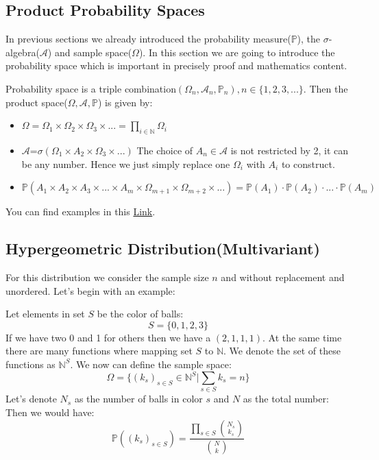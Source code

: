 \documentclass{article}
\newcommand{\N}{\mathbb{N}}
\newcommand{\Prob}{\mathbb{P}}
\begin{document}
\subsection{Product Probability Spaces}
In previous sections we already introduced the probability measure($\Prob$), the $\sigma$-algebra($\mathcal{A}$) and sample space($\Omega$). In this section we are going to introduce the probability space which is important in precisely proof and mathematics content.
\begin{definition}
	 Probability space is a triple combination$(\Omega_n,\mathcal{A}_n,\Prob_n), n\in \{1,2,3,...\}$. Then the product space($\Omega,\mathcal{A},\Prob$) is given by:\begin{itemize}
	 	\item $\Omega=\Omega_1\times\Omega_2\times\Omega_3\times...=\prod_{i\in \N}\Omega_i$
	 	\item $\mathcal{A}$=$\sigma(\Omega_1\times{A}_2\times\Omega_3\times...)$ The choice of $A_n\in \mathcal{A}$ is not restricted by 2, it can be any number. Hence we just simply replace one $\Omega_i$ with $A_i$ to construct.
	 	\item $\Prob(A_1\times A_2\times {A}_3\times ...\times A_m\times \Omega_{m+1}\times \Omega_{m+2}\times ...)=\Prob(A_1)\cdot\Prob(A_2)\cdot...\cdot \Prob(A_m)$
	 \end{itemize}

\end{definition}
You can find examples in this \hyperlink{https://www.youtube.com/watch?v=7WvdpFqptZk&list=PLBh2i93oe2qswFOC98oSFc37-0f4S3D4z&index=5}{Link}. 

\subsection{Hypergeometric Distribution(Multivariant)}
For this distribution we consider the sample size $n$ and without replacement and unordered. Let's begin with an example:
\begin{example}
Let elements in set $S$ be the color of balls:
	\begin{equation*}
	S=\{0,1,2,3\}
\end{equation*}
If we have two 0 and 1 for others then we have a $(2,1,1,1)$. At the same time there are many functions where mapping set $S$ to $\N$. We denote the set of these functions as $\N^S$. We now can define the sample space:
\begin{equation*}
	\Omega=\{(k_s)_{s\in S}\in \N^S| \sum_{s\in S}k_s=n        \}
\end{equation*}
Let's denote $N_s$ as the number of balls in color $s$ and $N$ as the total number:
Then we would have:
\begin{equation*}
	\Prob((k_s)_{s\in S})=\frac{\prod_{s\in S}{N_s\choose k_s}}{{N\choose k}}
\end{equation*}

\end{example}
\end{document}
